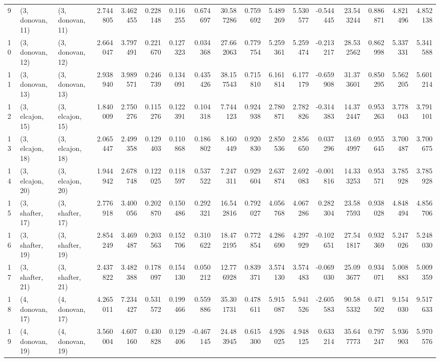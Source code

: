 \begin{tabular}{lllrrrrrrrrrrrrrr}
9  &  (3, donovan, 11) &  (3, donovan, 11) &  2.744805 &  3.462455 &   0.228148 &  0.116255 &  0.674697 &  30.587286 &  0.759692 &   5.489269 &  5.530577 & -0.544445 &  23.543244 &  0.886871 &  4.821496 &  4.852138 \\
10 &  (3, donovan, 12) &  (3, donovan, 12) &  2.664047 &  3.797491 &   0.221670 &  0.127323 &  0.034368 &  27.662063 &  0.779754 &   5.259361 &  5.259474 & -0.213217 &  28.532562 &  0.862998 &  5.337331 &  5.341588 \\
11 &  (3, donovan, 13) &  (3, donovan, 13) &  2.938940 &  3.989571 &   0.246739 &  0.134091 &  0.435426 &  38.157543 &  0.715810 &   6.161814 &  6.177179 & -0.659908 &  31.373601 &  0.850295 &  5.562205 &  5.601214 \\
12 &  (3, elcajon, 15) &  (3, elcajon, 15) &  1.840009 &  2.750276 &   0.115276 &  0.122391 &  0.104318 &   7.744123 &  0.924938 &   2.780871 &  2.782826 & -0.314383 &  14.372447 &  0.953263 &  3.778043 &  3.791101 \\
13 &  (3, elcajon, 18) &  (3, elcajon, 18) &  2.065447 &  2.499358 &   0.129403 &  0.110868 &  0.186802 &   8.160449 &  0.920830 &   2.850536 &  2.856650 &  0.037296 &  13.694997 &  0.955645 &  3.700487 &  3.700675 \\
14 &  (3, elcajon, 20) &  (3, elcajon, 20) &  1.944942 &  2.678748 &   0.122025 &  0.118597 &  0.537522 &   7.247311 &  0.929604 &   2.637874 &  2.692083 & -0.001816 &  14.333253 &  0.953571 &  3.785928 &  3.785928 \\
15 &  (3, shafter, 17) &  (3, shafter, 17) &  2.776918 &  3.400056 &   0.202870 &  0.150486 &  0.292321 &  16.542816 &  0.792027 &   4.056768 &  4.067286 &  0.282304 &  23.587593 &  0.938028 &  4.848494 &  4.856706 \\
16 &  (3, shafter, 19) &  (3, shafter, 19) &  2.854249 &  3.469487 &   0.203563 &  0.152706 &  0.310622 &  18.472195 &  0.772854 &   4.286690 &  4.297929 & -0.102651 &  27.541817 &  0.932369 &  5.247026 &  5.248030 \\
17 &  (3, shafter, 21) &  (3, shafter, 21) &  2.437822 &  3.482388 &   0.178097 &  0.154130 &  0.050212 &  12.776928 &  0.839371 &   3.574130 &  3.574483 & -0.069030 &  25.093677 &  0.934071 &  5.008883 &  5.009359 \\
18 &  (4, donovan, 17) &  (4, donovan, 17) &  4.265011 &  7.234427 &   0.531572 &  0.199466 &  0.559886 &  35.301731 &  0.478611 &   5.915087 &  5.941526 & -2.605583 &  90.585332 &  0.471502 &  9.154030 &  9.517633 \\
19 &  (4, donovan, 19) &  (4, donovan, 19) &  3.560004 &  4.607160 &   0.430828 &  0.129406 & -0.467145 &  24.483945 &  0.615300 &   4.926025 &  4.948125 &  0.633214 &  35.647773 &  0.797247 &  5.936903 &  5.970576 \\

\end{tabular}
